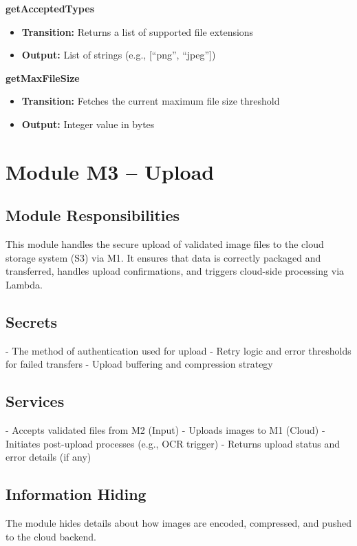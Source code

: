 \documentclass[12pt, titlepage]{article}
\begin{document}
\textbf{getAcceptedTypes}
\begin{itemize}
  \item \textbf{Transition:} Returns a list of supported file extensions
  \item \textbf{Output:} List of strings (e.g., [``png'', ``jpeg''])
\end{itemize}

\textbf{getMaxFileSize}
\begin{itemize}
  \item \textbf{Transition:} Fetches the current maximum file size threshold
  \item \textbf{Output:} Integer value in bytes
\end{itemize}



\section{Module M3 – Upload}
\label{SecM3}

\subsection*{Module Responsibilities}
This module handles the secure upload of validated image files to the cloud storage system (S3) via M1. It ensures that data is correctly packaged and transferred, handles upload confirmations, and triggers cloud-side processing via Lambda.

\subsection*{Secrets}
- The method of authentication used for upload  
- Retry logic and error thresholds for failed transfers  
- Upload buffering and compression strategy

\subsection*{Services}
- Accepts validated files from M2 (Input)  
- Uploads images to M1 (Cloud)  
- Initiates post-upload processes (e.g., OCR trigger)  
- Returns upload status and error details (if any)

\subsection*{Information Hiding}
The module hides details about how images are encoded, compressed, and pushed to the cloud backend.
\end{document}

